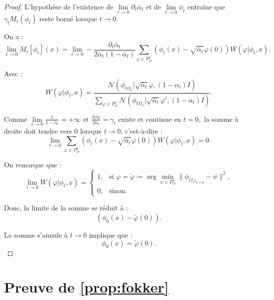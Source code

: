 \documentclass[a4paper,10pt]{article}
\theoremstyle{definition} %
\theoremstyle{definition} %
\theoremstyle{definition} %
\theoremstyle{definition} %
\begin{document}
\begin{proof}
    L’hypothèse de l’existence de \( \lim\limits_{t \to 0} \partial_t \bar \alpha_t \) et de \( \lim\limits_{t \to 0} \phi_t \) entraîne que \( \gamma_t M_t(\phi_t) \) reste borné lorsque \( t \to 0 \).

    On a :
    \[
    \lim\limits_{t \to 0} M_t [\phi_t] (x) = \lim\limits_{t \to 0} - \frac{\partial_t \bar \alpha_t}{2\bar  \alpha_t (1 - \bar \alpha_t)} \sum_{\varphi \in P_{\Omega}^{x}} \left(\phi_t(x) - \sqrt{\bar{\alpha}_t} \varphi(0)\right) W(\varphi | \phi_t, x).
    \]
    
    Avec :
    \[
    W(\varphi | \phi_t, x) = \frac{\mathcal{N}(\phi_{t\Omega_x} | \sqrt{\bar{\alpha}_t} \varphi, (1 - \alpha_t)I)}
    {\sum\limits_{\varphi \in P_{\Omega}^{x}} \mathcal{N}(\phi_{t\Omega_x} | \sqrt{\bar{\alpha}_t} \varphi', (1 - \alpha_t)I)}.
    \]

    Comme $
    \lim\limits_{t \to 0} \frac{1}{1 - \bar \alpha_t} = +\infty 
    \text{ et } 
    \frac{\partial_t \bar \alpha_t}{2 \bar \alpha_t} = \gamma_t \text{ existe et continue en } t=0,$
    la somme à droite doit tendre vers 0 lorsque \( t \to 0 \), c'est-à-dire :    
    \[
    \lim\limits_{t \to 0} \sum_{\varphi \in P_{\Omega}^{x}} \left(\phi_t(x) - \sqrt{\bar{\alpha}_t} \varphi(0)\right) W(\varphi | \phi_t, x) = 0.
    \]
    
    On remarque que :    
    \[
    \lim\limits_{t \to 0} W(\varphi | \phi_t, x) =
    \begin{cases} 
    1, & \text{si } \varphi = \tilde{\varphi} \coloneqq \arg\min\limits_{\psi \in P_{\Omega}^{x}} \|\phi_{\Omega_{x}|_{t=0}} - \psi \|^2, \\
    0, & \text{sinon}.
    \end{cases}
    \]
    
    Donc, la limite de la somme se réduit à :    
    \[
    (\phi_0(x) - \tilde{\varphi}(0)).
    \]
    
    La somme s’annule à \( t \to 0 \) implique que :    
    \[
    \phi_0(x) = \tilde{\varphi}(0).
    \]
\end{proof}




\appendix

\section{Preuve de \cref{prop:fokker} \label{sec:proof_focker}}
\end{document}
